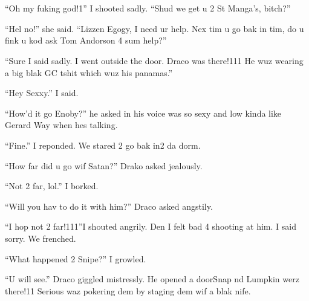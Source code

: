 \section{}


\XXX{\Xfill 666\Xfill}

\enquote{Oh my fuking god!1} I shooted sadly. \enquote{Shud we get u 2 
St Manga's,
bitch?}

\enquote{Hel no!} she said. \enquote{Lizzen Egogy, I need ur help. Nex tim u go bak in tim, do u fink u kod ask Tom Andorson 4 sum help?}

\enquote{Sure I said sadly. I went outside the door. Draco was there!111 He wuz wearing a big blak GC tshit which wuz his panamas.}

\enquote{Hey Sexxy.} I said.

\enquote{How'd it go Enoby?} he asked in his voice was so sexy and low kinda like Gerard Way when hes talking.

\enquote{Fine.} I reponded. We stared 2 go bak in2 da dorm.

\enquote{How far did u go wif Satan?} Drako asked jealously.

\enquote{Not 2 far, lol.} I borked.

\enquote{Will you hav to do it with him?} Draco asked angstily.

\enquote{I hop not 2 far!111}\@ I shouted angrily. Den I felt bad 4 shooting at him. I said sorry. We frenched.

\enquote{What happened 2 Snipe?} I growled.

\enquote{U will see.} Draco giggled mistressly. He opened a door\dotfill\newline\phantom{}\dotfill Snap nd Lumpkin werz there!11 Serious waz pokering dem by staging dem wif a blak nife.

